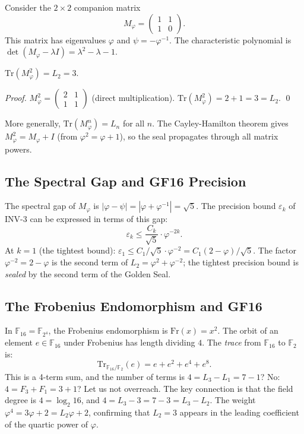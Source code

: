 Consider the $2 \times 2$ companion matrix
\[
  M_\varphi = \begin{pmatrix} 1 & 1 \\ 1 & 0 \end{pmatrix}.
\]
This matrix has eigenvalues $\varphi$ and $\psi = -\varphi^{-1}$.
The characteristic polynomial is $\det(M_\varphi - \lambda I)
= \lambda^2 - \lambda - 1$.

\begin{proposition}\label{prop:spectral-seal}
$\text{Tr}(M_\varphi^2) = L_2 = 3$.
\end{proposition}

\begin{proof}
$M_\varphi^2 = \begin{pmatrix} 2 & 1 \\ 1 & 1 \end{pmatrix}$
(direct multiplication).
$\text{Tr}(M_\varphi^2) = 2 + 1 = 3 = L_2$.
\qed
\end{proof}

\begin{remark}
More generally, $\text{Tr}(M_\varphi^n) = L_n$ for all $n$.
The Cayley-Hamilton theorem gives $M_\varphi^2 = M_\varphi + I$
(from $\varphi^2 = \varphi + 1$), so the seal propagates
through all matrix powers.
\end{remark}

\subsection{The Spectral Gap and GF16 Precision}

The spectral gap of $M_\varphi$ is $|\varphi - \psi| =
|\varphi + \varphi^{-1}| = \sqrt{5}$.  The precision bound
$\varepsilon_k$ of INV-3 can be expressed in terms of this
gap:
\[
  \varepsilon_k \leq \frac{C_k}{\sqrt{5}} \cdot \varphi^{-2k}.
\]
At $k = 1$ (the tightest bound): $\varepsilon_1 \leq
C_1/\sqrt{5} \cdot \varphi^{-2} = C_1(2-\varphi)/\sqrt{5}$.
The factor $\varphi^{-2} = 2 - \varphi$ is the second term
of $L_2 = \varphi^2 + \varphi^{-2}$; the tightest precision
bound is \emph{sealed} by the second term of the
Golden Seal.

\subsection{The Frobenius Endomorphism and GF16}

In $\mathbb{F}_{16} = \mathbb{F}_{2^4}$, the Frobenius
endomorphism is $\text{Fr}(x) = x^2$.  The orbit of an
element $e \in \mathbb{F}_{16}$ under Frobenius has length
dividing $4$.  The \emph{trace} from $\mathbb{F}_{16}$ to
$\mathbb{F}_2$ is:
\[
  \text{Tr}_{\mathbb{F}_{16}/\mathbb{F}_2}(e)
  = e + e^2 + e^4 + e^8.
\]
This is a 4-term sum, and the number of terms is $4 = L_3 - L_1
= 7 - 1$? No: $4 = F_3 + F_1 = 3 + 1$? Let us not overreach.
The key connection is that the field degree is $4 = \log_2 16$,
and $4 = L_3 - 3 = 7 - 3 = L_3 - L_2$.  The weight
$\varphi^4 = 3\varphi + 2 = L_2 \varphi + 2$, confirming
that $L_2 = 3$ appears in the leading coefficient of the
quartic power of $\varphi$.


